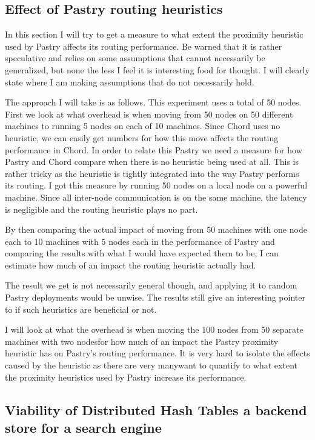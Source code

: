 
\subsection{Effect of Pastry routing heuristics}
In this section I will try to get a measure to what extent the proximity heuristic used by Pastry affects its routing performance. Be warned that it is rather speculative and relies on some assumptions that cannot necessarily be generalized, but none the less I feel it is interesting food for thought. I will clearly state where I am making assumptions that do not necessarily hold.

The approach I will take is as follows.
This experiment uses a total of 50 nodes. First we look at what overhead is when moving from 50 nodes on 50 different machines to running 5 nodes on each of 10 machines. Since Chord uses no heuristic, we can easily get numbers for how this move affects the routing performance in Chord. In order to relate this Pastry we need a measure for how Pastry and Chord compare when there is no heuristic being used at all. This is rather tricky as the heuristic is tightly integrated into the way Pastry performs its routing. I got this measure by running 50 nodes on a local node on a powerful machine. Since all inter-node communication is on the same machine, the latency is negligible and the routing heuristic plays no part. 

By then comparing the actual impact of moving from 50 machines with one node each to 10 machines with 5 nodes each in the performance of Pastry and comparing the results with what I would have expected them to be, I can estimate how much of an impact the routing heuristic actually had.

The result we get is not necessarily general though, and applying it to random Pastry deployments would be unwise. The results still give an interesting pointer to if such heuristics are beneficial or not.


I will look at what the overhead is when moving the 100 nodes from 50 separate machines with two nodesfor how much of an impact the Pastry proximity heuristic has on Pastry's routing performance. It is very hard to isolate the effects caused by the heuristic as there are very manywant to quantify to what extent the proximity heuristics used by Pastry increase its performance. 


\subsection{Viability of Distributed Hash Tables a backend store for a search engine}

